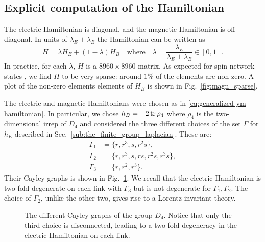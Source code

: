 \subsection{Explicit computation of the Hamiltonian}
\label{sub:explicit_computation_of_the_hamiltonian}

The electric Hamiltonian is diagonal, and the magnetic Hamiltonian is off-diagonal.
In units of $\lambda_E + \lambda_B$ the Hamiltonian can be written as
\begin{equation}
    H = \lambda H_E + (1-\lambda) H_B
    \quad \text{where} \quad
    \lambda = \frac{\lambda_E}{\lambda_E + \lambda_B} \in [0, 1].
\end{equation}
In practice, for each $\lambda$, $H$ is a $8960 \times 8960$ matrix.
As expected for spin-network states \cite{burgio2000physical}, we find $H$ to be very sparse: around $1\%$ of the elements are non-zero.
A plot of the non-zero elements elements of $H_B$ is shown in Fig.~\ref{fig:magn_sparse}.

The electric and magnetic Hamiltonians were chosen as in \eqref{eq:generalized ym hamiltonian}.
In particular, we chose $h_B = -2 \tr \rho_4$ where $\rho_4$ is the two-dimensional irrep of $D_4$ and considered the three different choices of the set $\Gamma$ for $h_E$ described in Sec.~\ref{sub:the_finite_group_laplacian}.
These are:
\begin{equation*}
    \begin{split}
        \Gamma_1 & = \{r,r^3,s,r^2s\}, \\
        \Gamma_2 & = \{r, r^3, s, rs, r^2s, r^3s\}, \\
        \Gamma_3 & = \{r, r^2, r^3\}.
    \end{split}
\end{equation*}
Their Cayley graphs is shown in Fig.~\ref{fig:d4_graphs}.
We recall that the electric Hamiltonian is two-fold degenerate on each link with $\Gamma_3$ but is not degenerate for $\Gamma_1, \Gamma_2$.
The choice of $\Gamma_2$, unlike the other two, gives rise to a Lorentz-invariant theory.

\begin{figure}[t]
    \centering
    
    \caption[Cayley graphs of the group $D_4$]{
        The different Cayley graphs of the group $D_4$.
        Notice that only the third choice is disconnected, leading to a two-fold degeneracy in the electric Hamiltonian on each link.
    }
    \label{fig:d4_graphs}
\end{figure}

